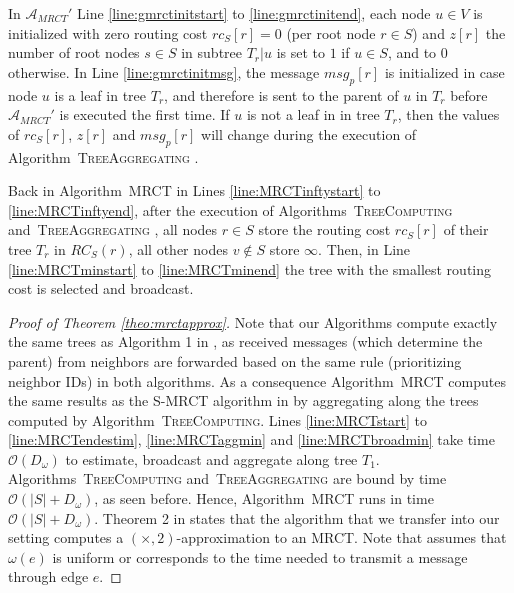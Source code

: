 \documentclass[11pt]{article}
\newcommand{\BO}{\mathcal{O}}
\newif\iffull
\begin{document}
In $\mathcal{A}_{MRCT}'$ Line \ref{line:gmrctinitstart} to \ref{line:gmrctinitend}, each node $u\in V$ is initialized with zero routing cost $rc_S[r]=0$ (per root node $r\in S$) and $z[r]$ the number of root nodes $s\in S$ in subtree $T_r|u$ is set to $1$ if $u\in S$, and to $0$ otherwise. In Line \ref{line:gmrctinitmsg}, the message $msg_p[r]$ is initialized in case node $u$ is a leaf in tree $T_r$, and therefore is sent to the parent of $u$ in $T_r$ before $\mathcal{A}_{MRCT}'$ is executed the first time. If $u$ is not a leaf in in tree $T_r$, then the values of $rc_S[r]$, $z[r]$ and $msg_p[r]$ will change during the execution of Algorithm\iffull~\ref{alg:TreeAggregating}\fi~\textsc{TreeAggregating} .

Back in Algorithm\iffull~\ref{alg:MRCT}\fi~\textsc{MRCT}  in Lines \ref{line:MRCTinftystart} to \ref{line:MRCTinftyend}, after the execution of Algorithms\iffull~\ref{alg:TreeComputing}\fi~\textsc{TreeComputing}  and\iffull~\ref{alg:TreeAggregating}\fi~\textsc{TreeAggregating} , all nodes $r\in S$ store the routing cost $rc_S[r]$ of their tree $T_r$ in $RC_S(r)$, all other nodes $v\notin S$ store $\infty$. Then, in Line \ref{line:MRCTminstart} to \ref{line:MRCTminend} the tree with the smallest routing cost is selected and broadcast.



\begin{proof}[Proof of Theorem \ref{theo:mrctapprox}]
Note that our Algorithms compute exactly the same trees as Algorithm 1 in \cite{hochuli:holzer:MRCST}, as received messages (which determine the parent) from neighbors are forwarded based on the same rule (prioritizing neighbor IDs) in both algorithms.
As a consequence Algorithm\iffull~\ref{alg:MRCT}\fi~\textsc{MRCT}  computes the same results as the S-MRCT algorithm in \cite{hochuli:holzer:MRCST} by aggregating along the trees computed by Algorithm\iffull~\ref{alg:TreeComputing}\fi~\textsc{TreeComputing}. Lines \ref{line:MRCTstart} to \ref{line:MRCTendestim}, \ref{line:MRCTaggmin} and \ref{line:MRCTbroadmin} take time $\BO(D_\omega)$ to estimate, broadcast and aggregate along tree $T_1$. Algorithms\iffull~\ref{alg:TreeComputing}\fi~\textsc{TreeComputing}  and\iffull~\ref{alg:TreeAggregating}\fi~\textsc{TreeAggregating}  are bound by time $\BO(|S|+D_\omega)$, as seen before. Hence, Algorithm\iffull~\ref{alg:MRCT}\fi~\textsc{MRCT}  runs in time $\BO(|S|+D_\omega)$. Theorem 2 in \cite{hochuli:holzer:MRCST} states that the algorithm that we transfer into our setting computes a $(\times,2)$-approximation to an MRCT. Note that \cite{hochuli:holzer:MRCST} assumes that $\omega(e)$ is uniform or corresponds to the time needed to transmit a message through edge $e$.
\end{proof}
\end{document}
